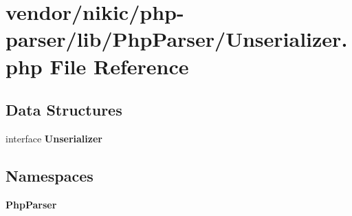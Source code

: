 \section{vendor/nikic/php-\/parser/lib/\+Php\+Parser/\+Unserializer.php File Reference}
\label{_unserializer_8php}
\subsection*{Data Structures}
\begin{DoxyCompactItemize}
\item 
interface {\bf Unserializer}
\end{DoxyCompactItemize}
\subsection*{Namespaces}
\begin{DoxyCompactItemize}
\item 
 {\bf Php\+Parser}
\end{DoxyCompactItemize}
